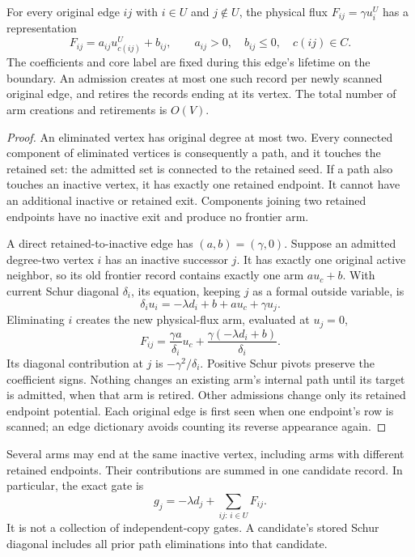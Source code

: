 \begin{lemma}
\label{lem:op3-scalar-flux-arms}
For every original edge $ij$ with $i\in U$ and $j\notin U$, the physical
flux $F_{ij}=\gamma u_i^U$ has a representation
\begin{equation}
 F_{ij}=a_{ij}u_{c(ij)}^U+b_{ij},\qquad
 a_{ij}>0,\quad b_{ij}\leq0,\quad c(ij)\in C.
 \label{eq:op3-physical-flux-arm}
\end{equation}
The coefficients and core label are fixed during this edge's lifetime on
the boundary. An admission creates at most one such record per newly scanned
original edge, and retires the records ending at its vertex. The total number
of arm creations and retirements is $O(V)$.
\end{lemma}
\begin{proof}
An eliminated vertex has original degree at most two. Every connected
component of eliminated vertices is consequently a path, and it touches the
retained set: the admitted set is connected to the retained seed. If a path
also touches an inactive vertex, it has exactly one retained endpoint.
It cannot have an additional inactive or retained exit. Components joining
two retained endpoints have no inactive exit and produce no frontier arm.

A direct retained-to-inactive edge has $(a,b)=(\gamma,0)$.
Suppose an admitted degree-two vertex $i$ has an inactive successor $j$.
It has exactly one original active neighbor, so its old frontier record
contains exactly one arm $a u_c+b$. With current Schur diagonal $\delta_i$,
its equation, keeping $j$ as a formal outside variable, is
\[
 \delta_i u_i=-\lambda d_i+b+a u_c+\gamma u_j.
\]
Eliminating $i$ creates the new physical-flux arm, evaluated at $u_j=0$,
\[
 F_{ij}=\frac{\gamma a}{\delta_i}u_c
       +\frac{\gamma(-\lambda d_i+b)}{\delta_i}.
\]
Its diagonal contribution at $j$ is $-\gamma^2/\delta_i$.
Positive Schur pivots preserve the coefficient signs. Nothing changes an
existing arm's internal path until its target is admitted, when that arm
is retired. Other admissions change only its retained endpoint potential.
Each original edge is first seen when one endpoint's row is scanned;
an edge dictionary avoids counting its reverse appearance again.
\end{proof}

Several arms may end at the same inactive vertex, including arms with
different retained endpoints. Their contributions are summed in one
candidate record. In particular, the exact gate is
\begin{equation}
 g_j=-\lambda d_j+\sum_{ij:\,i\in U}F_{ij}.
 \label{eq:op3-arm-original-gate}
\end{equation}
It is not a collection of independent-copy gates. A candidate's stored
Schur diagonal includes all prior path eliminations into that candidate.

